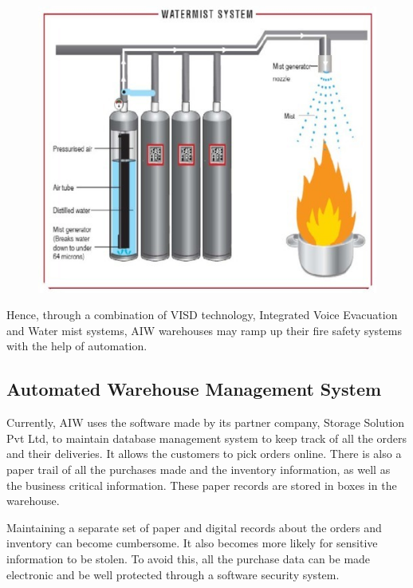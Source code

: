 \documentclass{report}
\begin{document}
\begin{figure}[H]
    
    \centering
    \includegraphics[scale=0.4]{mist.jpg}
    \caption{}
    
\end{figure}

Hence, through a combination of VISD technology, Integrated Voice Evacuation and Water mist systems, AIW warehouses may ramp up their fire safety systems with the help of automation.

\subsection{Automated Warehouse Management System}

Currently, AIW uses the software made by its partner company, Storage Solution Pvt Ltd, to maintain database management system to keep track of all the orders and their deliveries. It allows the customers to pick orders online. There is also a paper trail of all the purchases made and the inventory information, as well as the business critical information. These paper records are stored in boxes in the warehouse. 

Maintaining a separate set of paper and digital records about the orders and inventory can become cumbersome. It also becomes more likely for sensitive information to be stolen. To avoid this, all the purchase data can be made electronic and be well protected through a software security system. 
\end{document}
